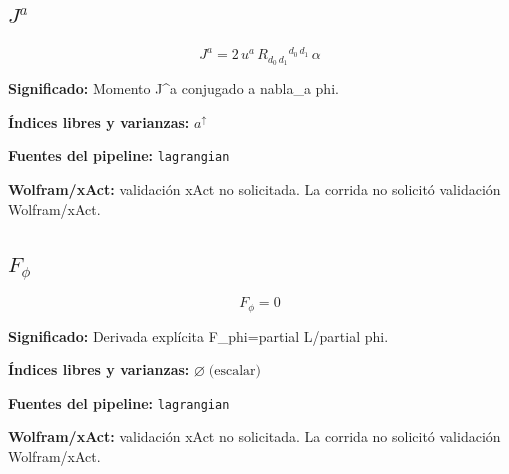 \documentclass[11pt]{article}
\begin{document}
\subsection*{$ J^a $}
\begin{dmath*}[breakdepth={5}]
J^a = 2\,u{}^{a}\,R{}_{d_{0}\,d_{1}}{}^{d_{0}\,d_{1}}\,\alpha
\end{dmath*}
\par\vspace{1.2\baselineskip}\noindent
\begin{minipage}{\linewidth}
\textbf{Significado:} Momento J^a conjugado a nabla\_a phi.\par
\textbf{Índices libres y varianzas:} $ a^{\uparrow} $\par
\textbf{Fuentes del pipeline:} \texttt{lagrangian}\par
\textbf{Wolfram/xAct:} validación xAct no solicitada. La corrida no solicitó validación Wolfram/xAct.\par
\end{minipage}
\subsection*{$ F_{\phi} $}
\begin{dmath*}[breakdepth={5}]
F_{\phi} = 0
\end{dmath*}
\par\vspace{1.2\baselineskip}\noindent
\begin{minipage}{\linewidth}
\textbf{Significado:} Derivada explícita F\_phi=partial L/partial phi.\par
\textbf{Índices libres y varianzas:} $ \varnothing\;\text{(escalar)} $\par
\textbf{Fuentes del pipeline:} \texttt{lagrangian}\par
\textbf{Wolfram/xAct:} validación xAct no solicitada. La corrida no solicitó validación Wolfram/xAct.\par
\end{minipage}
\end{document}

